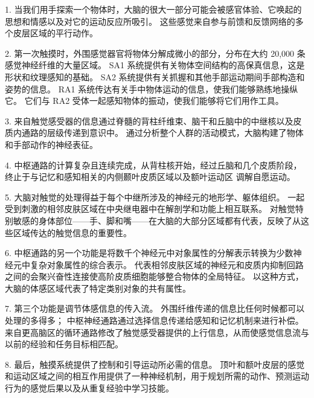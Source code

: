 1. 当我们用手探索一个物体时，大脑的很大一部分可能会被感官体验、它唤起的思想和情感以及对它的运动反应所吸引。 
这些感觉来自参与前馈和反馈网络的多个皮层区域的平行动作。 

2. 第一次触摸时，外围感觉器官将物体分解成微小的部分，分布在大约 20,000 条感觉神经纤维的大量区域。 
SA1 系统提供有关物体空间结构的高保真信息，这是形状和纹理感知的基础。 
SA2 系统提供有关抓握和其他手部运动期间手部构造和姿势的信息。 
RA1 系统传达有关手中物体运动的信息，使我们能够熟练地操纵它。 
它们与 RA2 受体一起感知物体的振动，使我们能够将它们用作工具。 


3. 来自触觉感受器的信息通过脊髓的背柱纤维束、脑干和丘脑中的中继核以及皮质内通路的层级传递到意识中。 
通过分析整个人群的活动模式，大脑构建了物体和手部动作的神经表征。 


4. 中枢通路的计算复杂且连续完成，从背柱核开始，经过丘脑和几个皮质阶段，终止于与记忆和感知相关的内侧颞叶皮质区域以及额叶运动区 调解自愿运动。 


5. 大脑对触觉的处理得益于每个中继所涉及的神经元的地形学、躯体组织。 
一起受到刺激的相邻皮肤区域在中央继电器中在解剖学和功能上相互联系。 
对触觉特别敏感的身体部位——手、脚和嘴——在大脑的大部分区域都有代表，反映了从这些区域传达的触觉信息的重要性。 


6. 中枢通路的另一个功能是将数千个神经元中对象属性的分解表示转换为少数神经元中复杂对象属性的综合表示。 
代表相邻皮肤区域的神经元和皮质内抑制回路之间的会聚兴奋性连接使高阶皮质细胞能够整合物体的全局特征。 
以这种方式，大脑的体感区域代表了特定类别对象的共有属性。 


7. 第三个功能是调节体感信息的传入流。 
外围纤维传递的信息比任何时候都可以处理的多得多； 中枢神经通路通过选择信息传递给感知和记忆机制来进行补偿。 
来自更高脑区的循环通路修改了触觉感受器提供的上行信息，从而使感觉信息流与以前的经验和任务目标相匹配。 


8. 最后，触摸系统提供了控制和引导运动所必需的信息。 
顶叶和额叶皮层的感觉和运动区域之间的相互作用提供了一种神经机制，用于规划所需的动作、预测运动行为的感觉后果以及从重复经验中学习技能。


